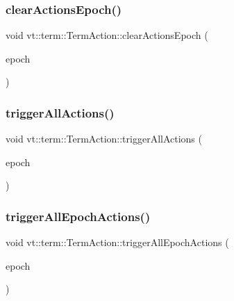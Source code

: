 \subsubsection{\texorpdfstring{clear\+Actions\+Epoch()}{clearActionsEpoch()}}
{\footnotesize\ttfamily void vt\+::term\+::\+Term\+Action\+::clear\+Actions\+Epoch (\begin{DoxyParamCaption}\item[{\hyperlink{namespacevt_a81d11b28122d43bf9834577e4a06440f}{Epoch\+Type} const \&}]{epoch }\end{DoxyParamCaption})}

\mbox{\label{structvt_1_1term_1_1_term_action_a0cf69a46cb567f12844745cb37a91971}} 
\subsubsection{\texorpdfstring{trigger\+All\+Actions()}{triggerAllActions()}}
{\footnotesize\ttfamily void vt\+::term\+::\+Term\+Action\+::trigger\+All\+Actions (\begin{DoxyParamCaption}\item[{\hyperlink{namespacevt_a81d11b28122d43bf9834577e4a06440f}{Epoch\+Type} const \&}]{epoch }\end{DoxyParamCaption})\hspace{0.3cm}{\ttfamily [protected]}}

\mbox{\label{structvt_1_1term_1_1_term_action_a23cc1dcce197af4e2e81fa659d952d94}} 
\subsubsection{\texorpdfstring{trigger\+All\+Epoch\+Actions()}{triggerAllEpochActions()}}
{\footnotesize\ttfamily void vt\+::term\+::\+Term\+Action\+::trigger\+All\+Epoch\+Actions (\begin{DoxyParamCaption}\item[{\hyperlink{namespacevt_a81d11b28122d43bf9834577e4a06440f}{Epoch\+Type} const \&}]{epoch }\end{DoxyParamCaption})\hspace{0.3cm}{\ttfamily [protected]}}



